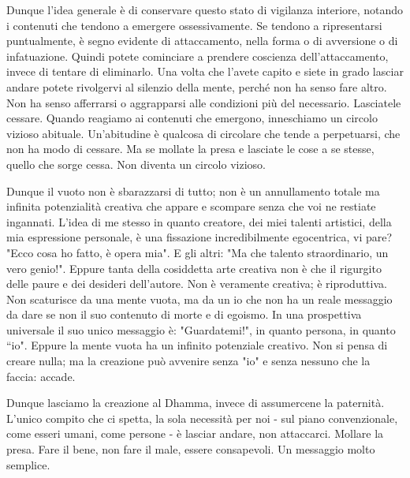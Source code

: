 Dunque l'idea generale è di conservare questo stato di vigilanza
interiore, notando i contenuti che tendono a emergere ossessivamente. Se
tendono a ripresentarsi puntualmente, è segno evidente di attaccamento,
nella forma o di avversione o di infatuazione. Quindi potete cominciare
a prendere coscienza dell'attaccamento, invece di tentare di eliminarlo.
Una volta che l'avete capito e siete in grado lasciar andare potete
rivolgervi al silenzio della mente, perché non ha senso fare altro. Non
ha senso afferrarsi o aggrapparsi alle condizioni più del necessario.
Lasciatele cessare. Quando reagiamo ai contenuti che emergono,
inneschiamo un circolo vizioso abituale. Un'abitudine è qualcosa di
circolare che tende a perpetuarsi, che non ha modo di cessare. Ma se
mollate la presa e lasciate le cose a se stesse, quello che sorge cessa.
Non diventa un circolo vizioso.

Dunque il vuoto non è sbarazzarsi di tutto; non è un annullamento totale
ma infinita potenzialità creativa che appare e scompare senza che voi ne
restiate ingannati. L'idea di me stesso in quanto creatore, dei miei
talenti artistici, della mia espressione personale, è una fissazione
incredibilmente egocentrica, vi pare? "Ecco cosa ho fatto, è opera mia".
E gli altri: "Ma che talento straordinario, un vero genio!". Eppure
tanta della cosiddetta arte creativa non è che il rigurgito delle paure
e dei desideri dell'autore. Non è veramente creativa; è riproduttiva.
Non scaturisce da una mente vuota, ma da un io che non ha un reale
messaggio da dare se non il suo contenuto di morte e di egoismo. In una
prospettiva universale il suo unico messaggio è: "Guardatemi!", in
quanto persona, in quanto “io". Eppure la mente vuota ha un infinito
potenziale creativo. Non si pensa di creare nulla; ma la creazione può
avvenire senza "io" e senza nessuno che la faccia: accade.

Dunque lasciamo la creazione al Dhamma, invece di assumercene la
paternità. L'unico compito che ci spetta, la sola necessità per noi -
sul piano convenzionale, come esseri umani, come persone - è lasciar
andare, non attaccarci. Mollare la presa. Fare il bene, non fare il
male, essere consapevoli. Un messaggio molto semplice.

